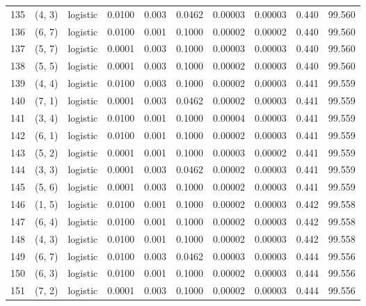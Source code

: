 \begin{tabular}{lllrrrrrrr}
135 &      (4, 3) &  logistic &  0.0100 &  0.003 &  0.0462 &          0.00003 &    0.00003 &       0.440 &    99.560 \\
136 &      (6, 7) &  logistic &  0.0100 &  0.001 &  0.1000 &          0.00002 &    0.00002 &       0.440 &    99.560 \\
137 &      (5, 7) &  logistic &  0.0001 &  0.003 &  0.1000 &          0.00003 &    0.00003 &       0.440 &    99.560 \\
138 &      (5, 5) &  logistic &  0.0001 &  0.003 &  0.1000 &          0.00002 &    0.00003 &       0.440 &    99.560 \\
139 &      (4, 4) &  logistic &  0.0100 &  0.003 &  0.1000 &          0.00002 &    0.00003 &       0.441 &    99.559 \\
140 &      (7, 1) &  logistic &  0.0001 &  0.003 &  0.0462 &          0.00002 &    0.00003 &       0.441 &    99.559 \\
141 &      (3, 4) &  logistic &  0.0100 &  0.001 &  0.1000 &          0.00004 &    0.00003 &       0.441 &    99.559 \\
142 &      (6, 1) &  logistic &  0.0100 &  0.001 &  0.1000 &          0.00002 &    0.00003 &       0.441 &    99.559 \\
143 &      (5, 2) &  logistic &  0.0001 &  0.001 &  0.1000 &          0.00003 &    0.00002 &       0.441 &    99.559 \\
144 &      (3, 3) &  logistic &  0.0001 &  0.003 &  0.0462 &          0.00002 &    0.00003 &       0.441 &    99.559 \\
145 &      (5, 6) &  logistic &  0.0001 &  0.003 &  0.1000 &          0.00002 &    0.00003 &       0.441 &    99.559 \\
146 &      (1, 5) &  logistic &  0.0100 &  0.001 &  0.1000 &          0.00002 &    0.00003 &       0.442 &    99.558 \\
147 &      (6, 4) &  logistic &  0.0100 &  0.001 &  0.1000 &          0.00002 &    0.00003 &       0.442 &    99.558 \\
148 &      (4, 3) &  logistic &  0.0100 &  0.001 &  0.1000 &          0.00002 &    0.00003 &       0.442 &    99.558 \\
149 &      (6, 7) &  logistic &  0.0100 &  0.003 &  0.0462 &          0.00003 &    0.00003 &       0.444 &    99.556 \\
150 &      (6, 3) &  logistic &  0.0100 &  0.001 &  0.1000 &          0.00002 &    0.00003 &       0.444 &    99.556 \\
151 &      (7, 2) &  logistic &  0.0001 &  0.003 &  0.1000 &          0.00002 &    0.00003 &       0.444 &    99.556 \\

\end{tabular}
